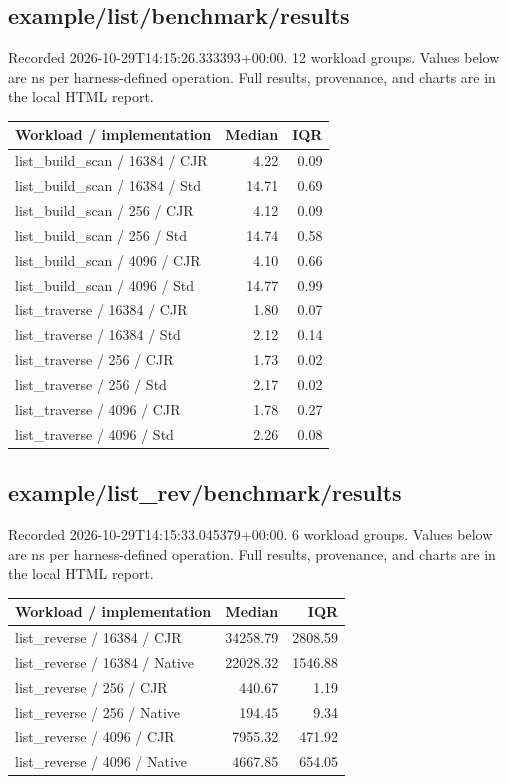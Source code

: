 \subsection{example/list/benchmark/results}
Recorded 2026-10-29T14:15:26.333393+00:00. 12 workload groups. Values below are ns per harness-defined operation. Full results, provenance, and charts are in the local HTML report.
\begin{longtable}{p{}rr}Workload / implementation & Median & IQR \\ \hline
list\_build\_scan / 16384 / CJR & 4.22 & 0.09 \\
list\_build\_scan / 16384 / Std & 14.71 & 0.69 \\
list\_build\_scan / 256 / CJR & 4.12 & 0.09 \\
list\_build\_scan / 256 / Std & 14.74 & 0.58 \\
list\_build\_scan / 4096 / CJR & 4.10 & 0.66 \\
list\_build\_scan / 4096 / Std & 14.77 & 0.99 \\
list\_traverse / 16384 / CJR & 1.80 & 0.07 \\
list\_traverse / 16384 / Std & 2.12 & 0.14 \\
list\_traverse / 256 / CJR & 1.73 & 0.02 \\
list\_traverse / 256 / Std & 2.17 & 0.02 \\
list\_traverse / 4096 / CJR & 1.78 & 0.27 \\
list\_traverse / 4096 / Std & 2.26 & 0.08 \\
\end{longtable}
\subsection{example/list\_rev/benchmark/results}
Recorded 2026-10-29T14:15:33.045379+00:00. 6 workload groups. Values below are ns per harness-defined operation. Full results, provenance, and charts are in the local HTML report.
\begin{longtable}{p{}rr}Workload / implementation & Median & IQR \\ \hline
list\_reverse / 16384 / CJR & 34258.79 & 2808.59 \\
list\_reverse / 16384 / Native & 22028.32 & 1546.88 \\
list\_reverse / 256 / CJR & 440.67 & 1.19 \\
list\_reverse / 256 / Native & 194.45 & 9.34 \\
list\_reverse / 4096 / CJR & 7955.32 & 471.92 \\
list\_reverse / 4096 / Native & 4667.85 & 654.05 \\
\end{longtable}

